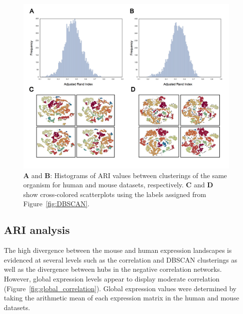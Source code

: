 \documentclass[12pt,oneside,onecolumn,a4paper]{article}
\begin{document}
\begin{figure}[H]
\begin{center}
\includegraphics[width=\columnwidth]{figures/cross_comparison}
\caption{\textbf{A} and \textbf{B}: Histograms of ARI values between clusterings of the same organism for human and mouse datasets, respectively. \textbf{C} and \textbf{D} show cross-colored scatterplots using the labels assigned from Figure~\ref{fig:DBSCAN}. \label{fig:cross_scatter_same}%
}
\end{center}
\end{figure}

\subsection{ARI analysis}

The high divergence between the mouse and human expression landscapes is evidenced at several levels such as the correlation and DBSCAN clusterings as well as the divergence between hubs in the negative correlation networks. However, global expression levels appear to display moderate correlation (Figure~\ref{fig:global_correlation}). Global expression values were determined by taking the arithmetic mean of each expression matrix in the human and mouse datasets.
\end{document}
